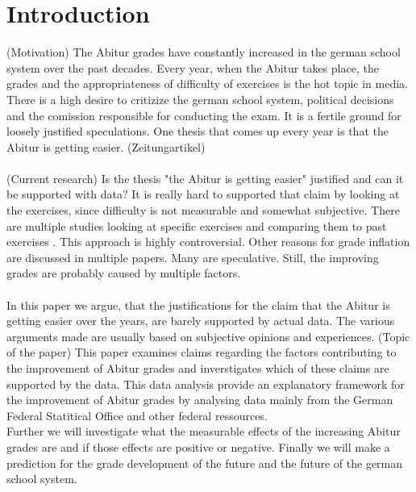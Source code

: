 \section{Introduction}
(Motivation)
The Abitur grades have constantly increased in the german school system over the past decades. Every year, when the Abitur takes place, the grades and the appropriateness of difficulty of exercises is the hot topic in media. \\
There is a high desire to critizize the german school system, political decisions and the comission responsible for conducting the exam. It is a fertile ground for loosely justified speculations. One thesis that comes up every year is that the Abitur is getting easier. (Zeitungartikel)\\\\
(Current research)
Is the thesis "the Abitur is getting easier" justified and can it be supported with data? It is really hard to supported that claim by looking at the exercises, since difficulty is not measurable and somewhat subjective. There are multiple studies looking at specific exercises and comparing them to past exercises \cite{kuhnel2015modellierungskompetenz} \cite{JahnkeKleinKühnelSonarSpindler+2014+115+122}. This approach is highly controversial. Other reasons for grade inflation are discussed in multiple papers. Many are speculative. Still, the improving grades are probably caused by multiple factors.\\\\
In this paper we argue, that the justifications for the claim that the Abitur is getting easier over the years, are barely supported by actual data. The various arguments made are usually based on subjective opinions and experiences.
(Topic of the paper)
This paper examines claims regarding the factors contributing to the improvement of Abitur grades and inverstigates which of these claims are supported by the data. This data analysis provide an explanatory framework for the improvement of Abitur grades by analysing data mainly from the German Federal Statitical Office and other federal ressources.\\
Further we will investigate what the measurable effects of the increasing Abitur grades are and if those effects are positive or negative. Finally we will make a prediction for the grade development of the future and the future of the german school system.
